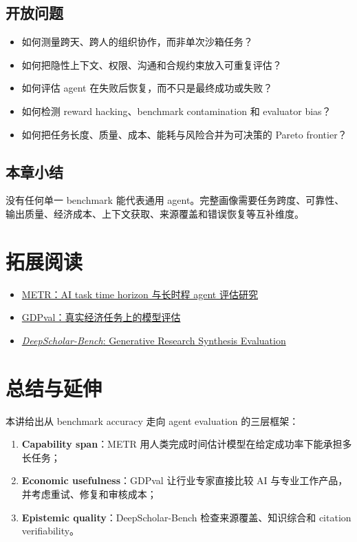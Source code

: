 \documentclass[a4paper]{article}
\begin{document}
\subsection{开放问题}

\begin{itemize}
    \item 如何测量跨天、跨人的组织协作，而非单次沙箱任务？
    \item 如何把隐性上下文、权限、沟通和合规约束放入可重复评估？
    \item 如何评估 agent 在失败后恢复，而不只是最终成功或失败？
    \item 如何检测 reward hacking、benchmark contamination 和 evaluator bias？
    \item 如何把任务长度、质量、成本、能耗与风险合并为可决策的 Pareto frontier？
\end{itemize}

\subsection{本章小结}

没有任何单一 benchmark 能代表通用 agent。完整画像需要任务跨度、可靠性、输出质量、经济成本、上下文获取、来源覆盖和错误恢复等互补维度。

\section{拓展阅读}

\begin{itemize}
    \item \href{https://metr.org/}{METR：AI task time horizon 与长时程 agent 评估研究}
    \item \href{https://openai.com/index/gdpval/}{GDPval：真实经济任务上的模型评估}
    \item \href{https://arxiv.org/search/?query=DeepScholar-Bench\&searchtype=all}{\emph{DeepScholar-Bench}: Generative Research Synthesis Evaluation}
\end{itemize}

\section{总结与延伸}

本讲给出从 benchmark accuracy 走向 agent evaluation 的三层框架：

\begin{enumerate}
    \item \textbf{Capability span}：METR 用人类完成时间估计模型在给定成功率下能承担多长任务；
    \item \textbf{Economic usefulness}：GDPval 让行业专家直接比较 AI 与专业工作产品，并考虑重试、修复和审核成本；
    \item \textbf{Epistemic quality}：DeepScholar-Bench 检查来源覆盖、知识综合和 citation verifiability。
\end{enumerate}
\end{document}
